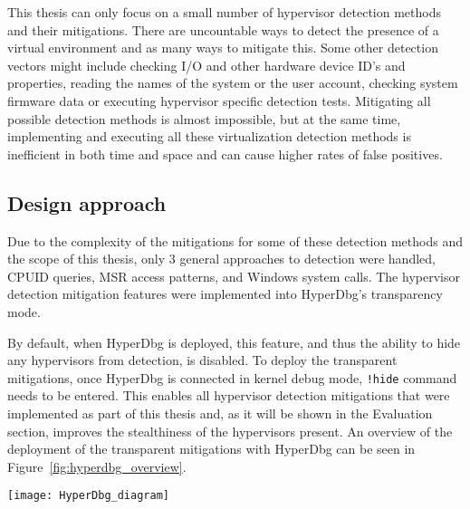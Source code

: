 This thesis can only focus on a small number of hypervisor detection methods and their mitigations. There are uncountable ways to detect the presence of a virtual environment and as many ways to mitigate this.
Some other detection vectors might include checking I/O and other hardware device ID's and properties, reading the names of the system or the user account, checking system firmware data or executing hypervisor specific detection tests.
Mitigating all possible detection methods is almost impossible, but at the same time, implementing and executing all these virtualization detection methods is inefficient in both time and space and can cause higher rates of false positives.


\subsection{Design approach}\label{design_approach}
Due to the complexity of the mitigations for some of these detection methods and the scope of this thesis, only 3 general approaches to detection were handled, CPUID queries, MSR access patterns, and Windows system calls. 
The hypervisor detection mitigation features were implemented into HyperDbg's transparency mode. 

By default, when HyperDbg is deployed, this feature, and thus the ability to hide any hypervisors from detection, is disabled. To deploy the transparent mitigations, 
once HyperDbg is connected in kernel debug mode, \texttt{!hide} command needs to be entered. This enables all hypervisor detection mitigations that were implemented as part of this thesis and, 
as it will be shown in the Evaluation section, improves the stealthiness of the hypervisors present. An overview of the deployment of the transparent mitigations with HyperDbg can be seen in Figure~\ref{fig:hyperdbg_overview}.

\begin{figure*}[t]
    \texttt{[image: HyperDbg\_diagram]} %
    \label{fig:hyperdbg_overview}
\end{figure*}


